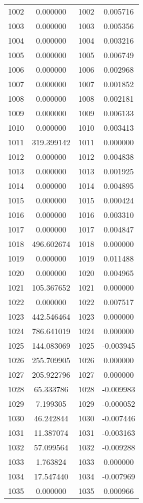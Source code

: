 \documentclass[12pt]{article}
\begin{document}
\begin{longtable}{@{}cccc@{}}
1002 & 0.000000 & 1002 & 0.005716 \\
1003 & 0.000000 & 1003 & 0.005356 \\
1004 & 0.000000 & 1004 & 0.003216 \\
1005 & 0.000000 & 1005 & 0.006749 \\
1006 & 0.000000 & 1006 & 0.002968 \\
1007 & 0.000000 & 1007 & 0.001852 \\
1008 & 0.000000 & 1008 & 0.002181 \\
1009 & 0.000000 & 1009 & 0.006133 \\
1010 & 0.000000 & 1010 & 0.003413 \\
1011 & 319.399142 & 1011 & 0.000000 \\
1012 & 0.000000 & 1012 & 0.004838 \\
1013 & 0.000000 & 1013 & 0.001925 \\
1014 & 0.000000 & 1014 & 0.004895 \\
1015 & 0.000000 & 1015 & 0.000424 \\
1016 & 0.000000 & 1016 & 0.003310 \\
1017 & 0.000000 & 1017 & 0.004847 \\
1018 & 496.602674 & 1018 & 0.000000 \\
1019 & 0.000000 & 1019 & 0.011488 \\
1020 & 0.000000 & 1020 & 0.004965 \\
1021 & 105.367652 & 1021 & 0.000000 \\
1022 & 0.000000 & 1022 & 0.007517 \\
1023 & 442.546464 & 1023 & 0.000000 \\
1024 & 786.641019 & 1024 & 0.000000 \\
1025 & 144.083069 & 1025 & -0.003945 \\
1026 & 255.709905 & 1026 & 0.000000 \\
1027 & 205.922796 & 1027 & 0.000000 \\
1028 & 65.333786 & 1028 & -0.009983 \\
1029 & 7.199305 & 1029 & -0.000052 \\
1030 & 46.242844 & 1030 & -0.007446 \\
1031 & 11.387074 & 1031 & -0.003163 \\
1032 & 57.099564 & 1032 & -0.009288 \\
1033 & 1.763824 & 1033 & 0.000000 \\
1034 & 17.547440 & 1034 & -0.007969 \\
1035 & 0.000000 & 1035 & 0.000966 \\

\end{longtable}
\end{document}
